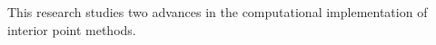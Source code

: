 
%
%

This research studies two advances in the computational implementation of interior point methods.